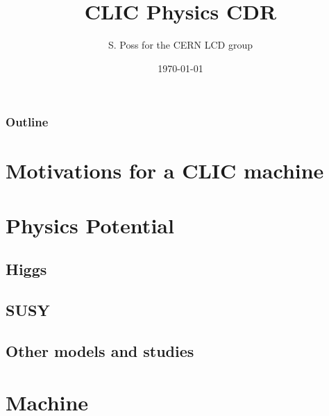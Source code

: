 \documentclass{beamer}
\author{S. Poss for the CERN LCD group}
\institute[CERN]{CERN}
\title[]{CLIC Physics CDR}
\date{\today}
\begin{document}
{

\begin{frame}
	\titlepage
\end{frame}

\begin{frame}
\frametitle{Outline}
\tableofcontents
\end{frame}
}

\section{Motivations for a CLIC machine}%

\section{Physics Potential}
\subsection{Higgs}%
\subsection{SUSY}%
\subsection{Other models and studies}%

\section{Machine}
\end{document}
